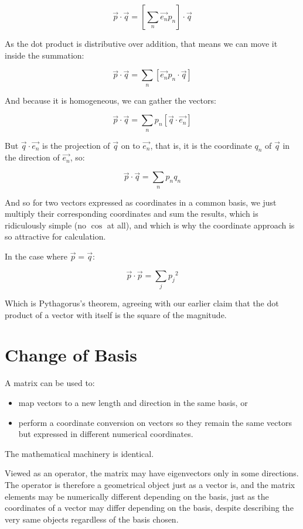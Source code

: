 $$
\vec{p}\cdot\vec{q} =
\left[ \sum_n{\vec{e_n}p_n} \right] \cdot \vec{q}
$$

As the dot product is distributive over addition, that means we can move it inside the summation:

$$
\vec{p}\cdot\vec{q} =
\sum_n \left[ \vec{e_n} p_n \cdot \vec{q} \right]
$$

And because it is homogeneous, we can gather the vectors:

$$
\vec{p}\cdot\vec{q} =
\sum_n p_n \left[ \vec{q} \cdot \vec{e_n} \right]
$$

But $\vec{q} \cdot \vec{e_n}$ is the projection of $\vec{q}$ on to $\vec{e_n}$, that is, it is the coordinate $q_n$ of $\vec{q}$ in the direction of $\vec{e_n}$, so:

$$
\vec{p}\cdot\vec{q} = \sum_n p_nq_n
$$

And so for two vectors expressed as coordinates in a common basis, we just multiply their corresponding coordinates and sum the results, which is ridiculously simple (no $\cos$ at all), and which is why the coordinate approach is so attractive for calculation.

In the case where $\vec{p} = \vec{q}$:

$$
\vec{p}\cdot\vec{p} = \sum_j {p_j}^2
$$

Which is Pythagorus's theorem, agreeing with our earlier claim that the dot product of a vector with itself is the square of the magnitude.

\section{Change of Basis}\label{sec:vectors-change-basis}

A matrix can be used to:

\begin{itemize}
    \item map vectors to a new length and direction in the same basis, or
    \item perform a coordinate conversion on vectors so they remain the same vectors but expressed in different numerical coordinates.
\end{itemize}

The mathematical machinery is identical.

Viewed as an operator, the matrix may have eigenvectors only in some directions. The operator is therefore a geometrical object just as a vector is, and the matrix elements may be numerically different depending on the basis, just as the coordinates of a vector may differ depending on the basis, despite describing the very same objects regardless of the basis chosen.

